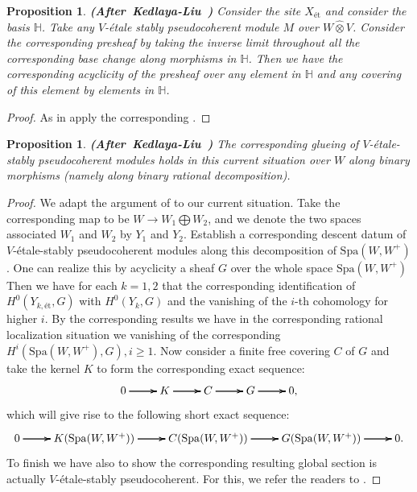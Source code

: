 \documentclass[12pt]{amsart}
\newtheorem{proposition}[theorem]{Proposition}
\theoremstyle{definition}
\numberwithin{equation}{section}
\begin{document}



\begin{proposition} \mbox{\bf{(After Kedlaya-Liu \cite[Theorem 2.5.11]{KL2})}}
Consider the site $X_\text{\'et}$ and consider the basis $\mathbb{H}$. Take any $V$-\'etale stably pseudocoherent module $M$ over $W\widehat{\otimes}V$. Consider the corresponding presheaf by taking the inverse limit throughout all the corresponding base change along morphisms in $\mathbb{H}$. Then we have the corresponding acyclicity of the presheaf over any element in $\mathbb{H}$ and any covering of this element by elements in $\mathbb{H}$.	
\end{proposition}


\begin{proof}
As in \cite[Theorem 2.5.11]{KL2} apply the corresponding \cite[Proposition 8.2.21]{KL1}.	
\end{proof}



\begin{proposition}\mbox{\bf{(After Kedlaya-Liu \cite[Lemma 2.5.13]{KL2})}}
The corresponding glueing of $V$-\'etale-stably pseudocoherent modules holds in this current situation over $W$ along binary morphisms (namely along binary rational decomposition). 	
\end{proposition}

\begin{proof}
We adapt the argument of \cite[Lemma 2.5.13]{KL2} to our current situation. Take the corresponding map to be $W\rightarrow W_1\bigoplus W_2$, and we denote the two spaces associated $W_1$ and $W_2$ by $Y_1$ and $Y_2$. Establish a corresponding descent datum of $V$-\'etale-stably pseudocoherent modules along this decomposition of $\mathrm{Spa}(W,W^+)$. One can realize this by acyclicity a sheaf $G$ over the whole space $\mathrm{Spa}(W,W^+)$ Then we have for each $k=1,2$ that the corresponding identification of $H^0(Y_{k,\text{\'et}},G)$ with $H^0(Y_k,G)$ and the vanishing of the $i$-th cohomology for higher $i$. By the corresponding results we have in the corresponding rational localization situation we vanishing of the corresponding $H^i(\mathrm{Spa}(W,W^+),G),i\geq 1$. Now consider a finite free covering $C$ of $G$ and take the kernel $K$ to form the corresponding exact sequence:
\[
\xymatrix@C+0pc@R+0pc{
0 \ar[r] \ar[r] \ar[r] &K \ar[r] \ar[r] \ar[r] &C  \ar[r] \ar[r] \ar[r] &G \ar[r] \ar[r] \ar[r] &0 ,   
}
\]
which will give rise to the following short exact sequence:
\[
\xymatrix@C+0pc@R+0pc{
0 \ar[r] \ar[r] \ar[r] &K(\mathrm{Spa}(W,W^+)) \ar[r] \ar[r] \ar[r] &C(\mathrm{Spa}(W,W^+))  \ar[r] \ar[r] \ar[r] &G(\mathrm{Spa}(W,W^+)) \ar[r] \ar[r] \ar[r] &0.   
}
\]
To finish we have also to show the corresponding resulting global section is actually $V$-\'etale-stably pseudocoherent. For this, we refer the readers to \cite[Lemma 2.22]{TX2}.

  	
\end{proof}
\end{document}
